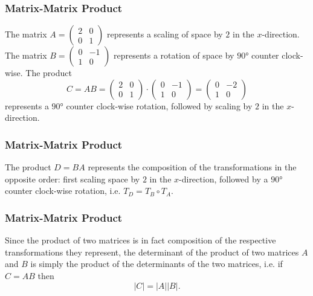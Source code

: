 \begin{frame}
  \frametitle{Matrix-Matrix Product}
  \begin{presentation_example}
    The matrix $A=\begin{pmatrix} 2 & 0 \\ 0 & 1 \end{pmatrix}$ represents a scaling of space by $2$ in the $x$-direction.
    The matrix $B=\begin{pmatrix} 0 & -1 \\ 1 & 0 \end{pmatrix}$ represents a rotation of space by $\ang{90}$ counter clock-wise.
    The product
    \begin{equation*}
      C = AB = \begin{pmatrix} 2 & 0 \\ 0 & 1 \end{pmatrix}\cdot\begin{pmatrix} 0 & -1 \\ 1 & 0 \end{pmatrix} = \begin{pmatrix} 0 & -2 \\ 1 & 0 \end{pmatrix}
    \end{equation*}
    represents a $\ang{90}$ counter clock-wise rotation, followed by scaling by $2$ in the $x$-direction.
  \end{presentation_example}
\end{frame}

\begin{frame}
  \frametitle{Matrix-Matrix Product}
  \begin{presentation_note}
    The product $D=BA$ represents the composition of the transformations in the opposite order: first scaling space by $2$ in the $x$-direction, followed by a $\ang{90}$ counter clock-wise rotation, i.e. $T_{D}=T_{B}\circ T_{A}$.
  \end{presentation_note}
\end{frame}

\begin{frame}
  \frametitle{Matrix-Matrix Product}
  Since the product of two matrices is in fact composition of the respective transformations they represent, the determinant of the product of two matrices $A$ and $B$ is simply the product of the determinants of the two matrices, i.e. if $C=AB$ then
  \begin{equation*}
    |C| = |A||B|.
  \end{equation*}
\end{frame}

